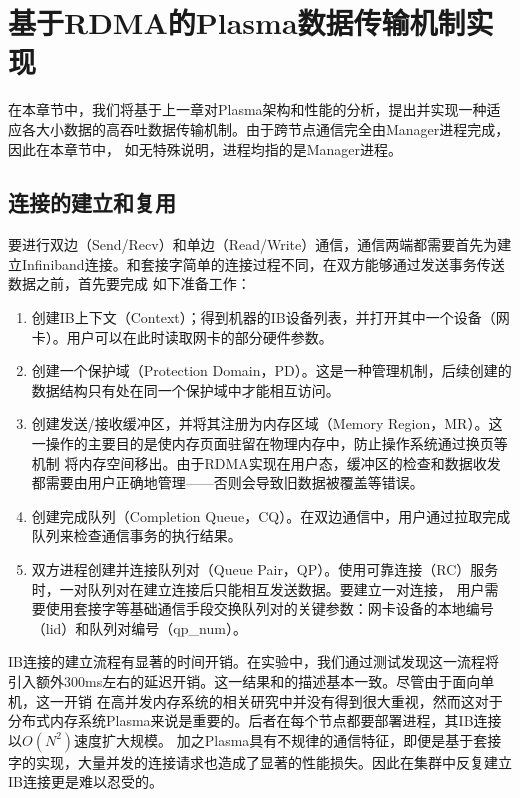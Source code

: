 \chapter{基于RDMA的Plasma数据传输机制实现}

在本章节中，我们将基于上一章对Plasma架构和性能的分析，提出并实现一种适应各大小数据的高吞吐数据传输机制。由于跨节点通信完全由Manager进程完成，因此在本章节中，
如无特殊说明，进程均指的是Manager进程。

\section{连接的建立和复用}

要进行双边（Send/Recv）和单边（Read/Write）通信，通信两端都需要首先为建立Infiniband连接。和套接字简单的连接过程不同，在双方能够通过发送事务传送数据之前，首先要完成
如下准备工作：

\begin{enumerate}
	\item 创建IB上下文（Context）；得到机器的IB设备列表，并打开其中一个设备（网卡）。用户可以在此时读取网卡的部分硬件参数。
	\item 创建一个保护域（Protection Domain，PD）。这是一种管理机制，后续创建的数据结构只有处在同一个保护域中才能相互访问。
	\item 创建发送/接收缓冲区，并将其注册为内存区域（Memory Region，MR）。这一操作的主要目的是使内存页面驻留在物理内存中，防止操作系统通过换页等机制
	将内存空间移出。由于RDMA实现在用户态，缓冲区的检查和数据收发都需要由用户正确地管理——否则会导致旧数据被覆盖等错误。
	\item 创建完成队列（Completion Queue，CQ）。在双边通信中，用户通过拉取完成队列来检查通信事务的执行结果。
	\item 双方进程创建并连接队列对（Queue Pair，QP）。使用可靠连接（RC）服务时，一对队列对在建立连接后只能相互发送数据。要建立一对连接，
	用户需要使用套接字等基础通信手段交换队列对的关键参数：网卡设备的本地编号（lid）和队列对编号（qp\_num）。
\end{enumerate}

IB连接的建立流程有显著的时间开销。在实验中，我们通过测试发现这一流程将引入额外300ms左右的延迟开销。这一结果和\cite{}的描述基本一致。尽管由于面向单机，这一开销
在高并发内存系统的相关研究中并没有得到很大重视，然而这对于分布式内存系统Plasma来说是重要的。后者在每个节点都要部署进程，其IB连接以$O(N^2)$速度扩大规模。
加之Plasma具有不规律的通信特征，即便是基于套接字的实现，大量并发的连接请求也造成了显著的性能损失。因此在集群中反复建立IB连接更是难以忍受的。

